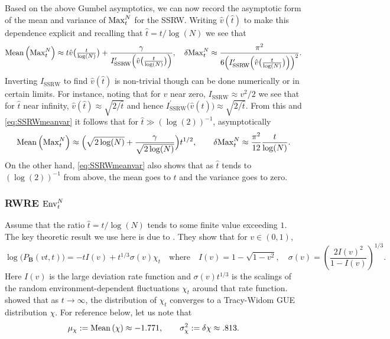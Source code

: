 Based on the above Gumbel asymptotics, we can now record the asymptotic form of the mean and variance of $\mathrm{Max}^{N}_t$ for the SSRW. Writing $\hat{v}(\hat{t})$ to make this dependence explicit and recalling that $\hat{t}= t/\log(N)$ we see that
\begin{equation}\label{eq:SSRWmeanvar}
\mathrm{Mean}\left(\mathrm{Max}^{N}_t\right)\approx t\hat v\big(\tfrac{t}{\log(N)}\big) +  \frac{\gamma}{I_{\mathrm{SSRW}}^{\prime}\Big(\hat v\big(\frac{t}{\log(N)}\big)\Big)} ,\quad \var{\mathrm{Max}^{N}_t}\approx
 \frac{\pi^2}{ 6 \Big(I_{\mathrm{SSRW}}^{\prime}\Big(\hat v\big(\frac{t}{\log(N)}\big)\Big)\Big)^2}.
\end{equation}
Inverting $I_{\mathrm{SSRW}}$ to find $\hat v(\hat{t})$ is non-trivial though can be done numerically or in certain limits. For instance, noting that for $v$ near zero, $I_{\mathrm{SSRW}}\approx v^2/2$  we see that for $\hat{t}$ near infinity,  $\hat{v}(\hat{t})\approx \sqrt{2/\hat{t}}$ and hence
$I_{\mathrm{SSRW}}^{\prime}\big(\hat v(\hat{t})\big)\approx \sqrt{2/\hat{t}}$. From this and \eqref{eq:SSRWmeanvar} it follows that for $\hat{t}\gg  (\log(2))^{-1}$, asymptotically
$$
\mathrm{Mean}\left(\mathrm{Max}^{N}_t\right)\approx \Big(\sqrt{2 \log(N)} + \frac{\gamma}{\sqrt{2 \log(N)}}\Big) t^{1/2},\qquad
\var{\mathrm{Max}^{N}_t}\approx \frac{\pi^2}{12}\frac{t}{\log(N)}.
$$
On the other hand, \eqref{eq:SSRWmeanvar} also shows that as $\hat{t}$ tends to $ (\log(2))^{-1}$ from above, the mean goes to $t$ and the variance goes to zero.

\subsubsection{RWRE $\mathrm{Env}^{N}_t$}\label{sec:RWREenv}
Assume that the ratio $\hat{t} = t/\log(N)$ tends to some finite value exceeding $1$. The key theoretic result we use  here is due to \cite{barraquand_random-walk_2017}. They show that for $v\in (0,1)$,
\begin{equation}\label{eq:bc}
\log\big(P_{\mathbf{B}}(vt,t)\big) = - t I(v)  + t^{1/3} \sigma(v)\chi_{t}\quad \textrm{where}\quad I(v) = 1- \sqrt{1- v^2},\quad\sigma(v) = \left(\frac{2 I(v)^2}{1-I(v)}\right)^{1/3}.
\end{equation}
Here $I(v)$ is the large deviation rate function and $\sigma(v) t^{1/3}$ is the scalings of the random environment-dependent fluctuations $\chi_t$ around that rate function. \cite{barraquand_random-walk_2017} showed that as $t\to\infty$, the distribution of $\chi_t$ converges to a Tracy-Widom GUE distribution $\chi$. For reference below, let us note that \cite{prahofer_universal_2000}
$$
\mu_\chi := \mathrm{Mean}\left(\chi\right) \approx -1.771,\qquad \sigma_{\chi}^2 := \var{\chi}\approx .813.
$$

